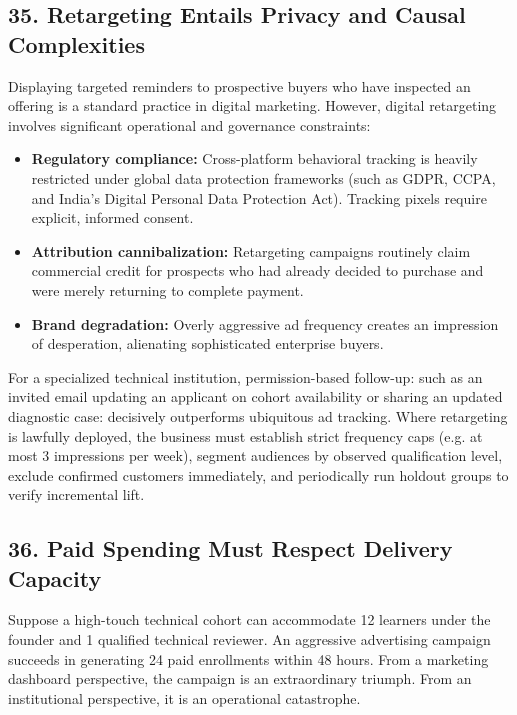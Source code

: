 \subsection*{35. Retargeting Entails Privacy and Causal Complexities}

Displaying targeted reminders to prospective buyers who have inspected an offering is a standard practice in digital marketing. However, digital retargeting involves significant operational and governance constraints:
\begin{itemize}[leftmargin=*,itemsep=1pt]
  \item \textbf{Regulatory compliance:} Cross-platform behavioral tracking is heavily restricted under global data protection frameworks (such as GDPR, CCPA, and India's Digital Personal Data Protection Act). Tracking pixels require explicit, informed consent.
  \item \textbf{Attribution cannibalization:} Retargeting campaigns routinely claim commercial credit for prospects who had already decided to purchase and were merely returning to complete payment.
  \item \textbf{Brand degradation:} Overly aggressive ad frequency creates an impression of desperation, alienating sophisticated enterprise buyers.
\end{itemize}

For a specialized technical institution, permission-based follow-up: such as an invited email updating an applicant on cohort availability or sharing an updated diagnostic case: decisively outperforms ubiquitous ad tracking. Where retargeting is lawfully deployed, the business must establish strict frequency caps (e.g. at most 3 impressions per week), segment audiences by observed qualification level, exclude confirmed customers immediately, and periodically run holdout groups to verify incremental lift.

\subsection*{36. Paid Spending Must Respect Delivery Capacity}

Suppose a high-touch technical cohort can accommodate 12 learners under the founder and 1 qualified technical reviewer. An aggressive advertising campaign succeeds in generating 24 paid enrollments within 48 hours. From a marketing dashboard perspective, the campaign is an extraordinary triumph. From an institutional perspective, it is an operational catastrophe.

